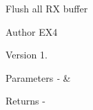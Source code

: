 Flush all R\-X buffer \begin{DoxyAuthor}{Author}
E\-X4 
\end{DoxyAuthor}
\begin{DoxyVersion}{Version}
1. 
\end{DoxyVersion}

\begin{DoxyParams}{Parameters}
{\em -\/} & \\
\hline
\end{DoxyParams}
\begin{DoxyReturn}{Returns}
-\/ 
\end{DoxyReturn}
